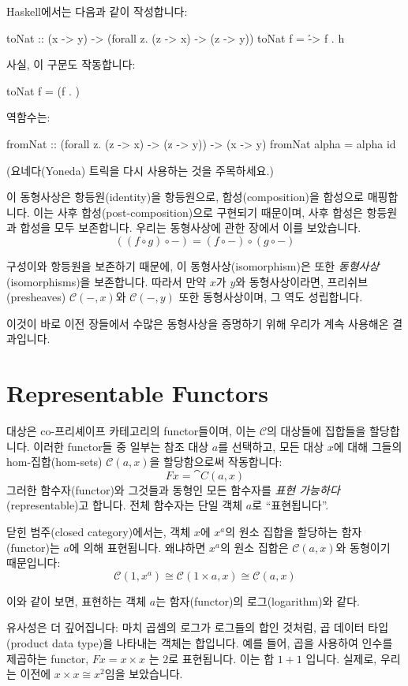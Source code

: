 \documentclass[DaoFP]{subfiles}
\begin{document}
Haskell에서는 다음과 같이 작성합니다:
\begin{haskell}
toNat :: (x -> y) -> (forall z. (z -> x) -> (z -> y))
toNat f = \h -> f . h 
\end{haskell}
사실, 이 구문도 작동합니다:
\begin{haskell}
toNat f = (f . )
\end{haskell}
역함수는:
\begin{haskell}
fromNat :: (forall z. (z -> x) -> (z -> y)) -> (x -> y)
fromNat alpha = alpha id
\end{haskell}
(요네다(Yoneda) 트릭을 다시 사용하는 것을 주목하세요.)

이 동형사상은 항등원(identity)을 항등원으로, 합성(composition)을 합성으로 매핑합니다. 이는 사후 합성(post-composition)으로 구현되기 때문이며, 사후 합성은 항등원과 합성을 모두 보존합니다. 우리는 동형사상에 관한 장에서 이를 보았습니다.
\[ ((f \circ g) \circ -) = (f \circ -) \circ (g \circ -) \]

구성이와 항등원을 보존하기 때문에, 이 동형사상(isomorphism)은 또한 \emph{동형사상}(isomorphisms)을 보존합니다. 따라서 만약 $x$가 $y$와 동형사상이라면, 프리쉬브(presheaves) $ \mathcal{C}(-, x)$와 $ \mathcal{C}(-, y)$ 또한 동형사상이며, 그 역도 성립합니다.

이것이 바로 이전 장들에서 수많은 동형사상을 증명하기 위해 우리가 계속 사용해온 결과입니다.

\section{Representable Functors}

대상은 co-프리셰이프 카테고리의 functor들이며, 이는 $\mathcal{C}$의 대상들에 집합들을 할당합니다. 이러한 functor들 중 일부는 참조 대상 $a$를 선택하고, 모든 대상 $x$에 대해 그들의 hom-집합(hom-sets) $\mathcal{C}(a, x)$을 할당함으로써 작동합니다:
\[ F x = \cat C(a, x) \]
그러한 함수자(functor)와 그것들과 동형인 모든 함수자를 \emph{표현 가능하다}(representable)고 합니다. 전체 함수자는 단일 객체 $a$로 ``표현됩니다''.

닫힌 범주(closed category)에서는, 객체 $x$에 $x^a$의 원소 집합을 할당하는 함자(functor)는 $a$에 의해 표현됩니다. 왜냐하면 $x^a$의 원소 집합은 $\mathcal{C}(a, x)$와 동형이기 때문입니다:
\[\mathcal{C}(1, x^a) \cong \mathcal{C}(1 \times a, x) \cong \mathcal{C} (a, x)\]

이와 같이 보면, 표현하는 객체 $a$는 함자(functor)의 로그(logarithm)와 같다.

유사성은 더 깊어집니다: 마치 곱셈의 로그가 로그들의 합인 것처럼, 곱 데이터 타입(product data type)을 나타내는 객체는 합입니다. 예를 들어, 곱을 사용하여 인수를 제곱하는 functor, $F x = x \times x$ 는 $2$로 표현됩니다. 이는 합 $1 + 1$ 입니다. 실제로, 우리는 이전에 $x \times x \cong x^2$임을 보았습니다.
\end{document}

